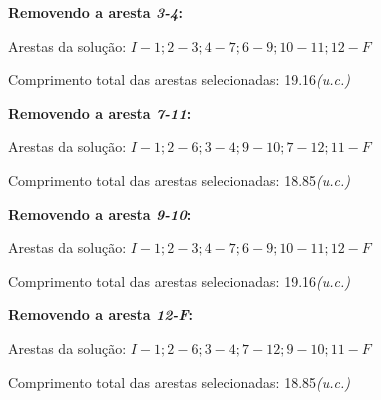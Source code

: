 \documentclass[runningheads]{llncs}
\begin{document}
    \bigskip
    \textbf{Removendo a aresta \textit{3-4}:}

    Arestas da solução: $I-1; 2-3; 4-7; 6-9; 10-11; 12-F$

    Comprimento total das arestas selecionadas: 19.16\textit{(u.c.)}

    \bigskip
    \textbf{Removendo a aresta \textit{7-11}:}

    Arestas da solução: $I-1; 2-6; 3-4; 9-10; 7-12; 11-F$

    Comprimento total das arestas selecionadas: 18.85\textit{(u.c.)}

    \bigskip
    \textbf{Removendo a aresta \textit{9-10}:}

    Arestas da solução: $I-1; 2-3; 4-7; 6-9; 10-11; 12-F$

    Comprimento total das arestas selecionadas: 19.16\textit{(u.c.)}

    \bigskip
    \textbf{Removendo a aresta \textit{12-F}:}

    Arestas da solução: $I-1; 2-6; 3-4; 7-12; 9-10; 11-F$

    Comprimento total das arestas selecionadas: 18.85\textit{(u.c.)}


\end{document}
